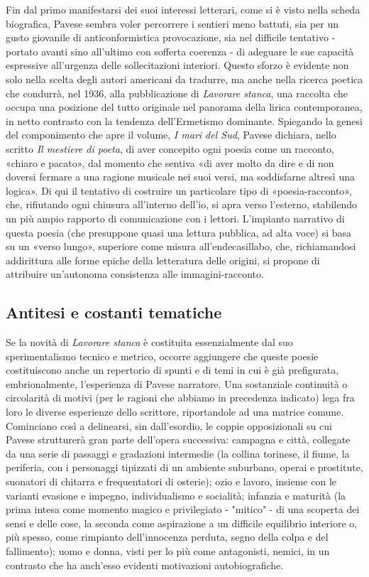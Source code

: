 Fin dal primo manifestarsi dei suoi interessi letterari, come si è visto nella scheda biografica, Pavese sembra voler percorrere i sentieri meno battuti, sia per un gusto giovanile di anticonformistica provocazione, sia nel difficile tentativo - portato avanti sino all'ultimo con sofferta coerenza - di adeguare le sue capacità espressive all'urgenza delle sollecitazioni interiori. Questo sforzo è evidente non solo nella scelta degli autori americani da tradurre, ma anche nella ricerca poetica che condurrà, nel 1936, alla pubblicazione di \textit{Lavorare stanca}, una raccolta che occupa una posizione del tutto originale nel panorama della lirica contemporanea, in netto contrasto con la tendenza dell'Ermetismo dominante. Spiegando la genesi del componimento che apre il volume, \textit{I mari del Sud}, Pavese dichiara, nello scritto \textit{Il mestiere di poeta}, di aver concepito ogni poesia come un racconto, «chiaro e pacato», dal momento che sentiva «di aver molto da dire e di non doversi fermare a una ragione musicale nei suoi versi, ma soddisfarne altresì una logica». Di qui il tentativo di costruire un particolare tipo di «poesia-racconto», che, rifiutando ogni chiusura all'interno dell'io, si apra verso l'esterno, stabilendo un più ampio rapporto di comunicazione con i lettori. L'impianto narrativo di questa poesia (che presuppone quasi una lettura pubblica, ad alta voce) si basa su un «verso lungo», superiore come misura all'endecasillabo, che, richiamandosi addirittura alle forme epiche della letteratura delle origini, si propone di attribuire un'autonoma consistenza alle immagini-racconto.

\subsection{Antitesi e costanti tematiche}

Se la novità di \textit{Lavorare stanca} è costituita essenzialmente dal suo sperimentalismo tecnico e metrico, occorre aggiungere che queste poesie costituiscono anche un repertorio di spunti e di temi in cui è già prefigurata, embrionalmente, l'esperienza di Pavese narratore. Una sostanziale continuità o circolarità di motivi (per le ragioni che abbiamo in precedenza indicato) lega fra loro le diverse esperienze dello scrittore, riportandole ad una matrice comune. Cominciano così a delinearsi, sin dall'esordio, le coppie opposizionali su cui Pavese strutturerà gran parte dell'opera successiva: campagna e città, collegate da una serie di passaggi e gradazioni intermedie (la collina torinese, il fiume, la periferia, con i personaggi tipizzati di un ambiente suburbano, operai e prostitute, suonatori di chitarra e frequentatori di osterie); ozio e lavoro, insieme con le varianti evasione e impegno, individualismo e socialità; infanzia e maturità (la prima intesa come momento magico e privilegiato - "mitico" - di una scoperta dei sensi e delle cose, la seconda come aspirazione a un difficile equilibrio interiore o, più spesso, come rimpianto dell'innocenza perduta, segno della colpa e del fallimento); uomo e donna, visti per lo più come antagonisti, nemici, in un contrasto che ha anch'esso evidenti motivazioni autobiografiche.

